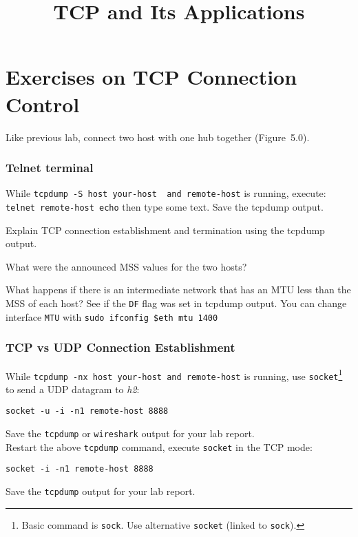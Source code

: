 \documentclass{../UTNetLab}
\title{TCP and Its Applications}
\begin{document}
\part{Exercises on TCP Connection Control}
    Like previous lab, connect two host with one hub together (Figure~5.0).

\section{Telnet terminal}
    While \lstinline[emph={your-host, remote-host}]{tcpdump -S host your-host  and remote-host} is running, execute: \lstinline[emph={your-host, remote-host}]{telnet remote-host echo} then type some text.
    Save the tcpdump output.
    
    \begin{report}
    \item Explain TCP connection establishment and termination using the tcpdump output.
    
    \item What were the announced MSS values for the two hosts?
    
    \item What happens if there is an intermediate network that has an MTU less than the MSS of each host?
    See if the \texttt{DF} flag was set in tcpdump output.
    You can change interface \texttt{MTU} with \lstinline[emph=$eth]{sudo ifconfig $eth mtu 1400}
    \end{report}
    
\section{TCP vs UDP Connection Establishment}
    While \lstinline[emph={your-host, remote-host}]{tcpdump -nx host your-host and remote-host} is running, use \lstinline{socket}\footnote{Basic command is \lstinline{sock}. Use alternative \lstinline{socket} (linked to \lstinline{sock}).} to send a UDP datagram to \textit{h2}:
    \begin{lstlisting}[emph={your-host, remote-host}]
socket -u -i -n1 remote-host 8888
    \end{lstlisting}
    {Save} the \lstinline{tcpdump} or \lstinline{wireshark} output for your lab report. \\
    Restart the above \lstinline{tcpdump} command, execute \lstinline{socket} in the TCP mode:
    \begin{lstlisting}[emph={remote-host}]
socket -i -n1 remote-host 8888
    \end{lstlisting}
    {Save} the \lstinline{tcpdump} output for your lab report.
    
\end{document}
